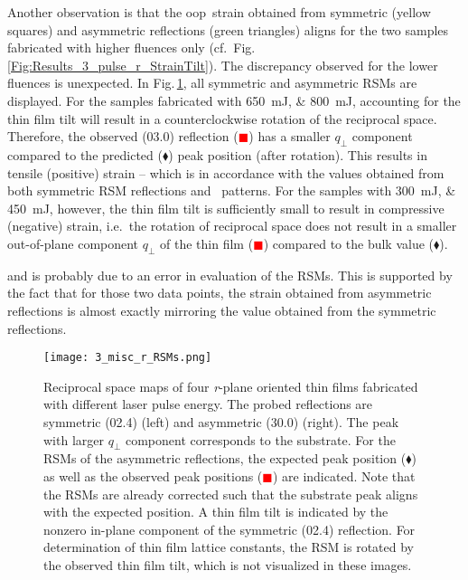{\sloppy %
Another observation is that the \gls{oop}\ strain obtained from symmetric (yellow squares) and asymmetric reflections (green triangles) aligns for the two samples fabricated with higher fluences only (cf.\ Fig.\,\ref{Fig:Results_3_pulse_r_StrainTilt}).
The discrepancy observed for the lower fluences is unexpected.
In Fig.\,\ref{Fig:Res_3_RSMs_r}, all symmetric and asymmetric RSMs are displayed.
For the samples fabricated with \qtylist{650;800}{\milli\J}, accounting for the thin film tilt will result in a counterclockwise rotation of the reciprocal space.
Therefore, the observed (03.0) reflection (\textcolor{red}{$\blacksquare$}) has a smaller $q_\perp$ component compared to the predicted ($\blacklozenge$) peak position (after rotation).
This results in tensile (positive) strain -- which is in accordance with the values obtained from both symmetric RSM reflections and \thetaomega\ patterns.
For the samples with \qtylist{300;450}{\milli\J}, however, the thin film tilt is sufficiently small to result in compressive (negative) strain, i.e.\ the rotation of reciprocal space does not result in a smaller out-of-plane component $q_\perp$ of the thin film (\textcolor{red}{$\blacksquare$}) compared to the bulk value ($\blacklozenge$).

and is probably due to an error in evaluation of the \glspl{RSM}.
This is supported by the fact that for those two data points, the strain obtained from asymmetric reflections is almost exactly mirroring the value obtained from the symmetric reflections.
\par}
\begin{figure}
    \centering
    \texttt{[image: 3\_misc\_r\_RSMs.png]}
    \caption{
        Reciprocal space maps of four \textit{r}-plane oriented thin films fabricated with different laser pulse energy.
        The probed reflections are symmetric (02.4) (left) and asymmetric (30.0) (right).
        The peak with larger $q_\perp$ component corresponds to the substrate.
        For the RSMs of the asymmetric reflections, the expected peak position ($\blacklozenge$) as well as the observed peak positions (\textcolor{red}{$\blacksquare$}) are indicated.
        Note that the RSMs are already corrected such that the substrate peak aligns with the expected position.
        A thin film tilt is indicated by the nonzero in-plane component of the symmetric (02.4) reflection.
        For determination of thin film lattice constants, the RSM is rotated by the observed thin film tilt, which is not visualized in these images.
    }
    \label{Fig:Res_3_RSMs_r}
\end{figure}

